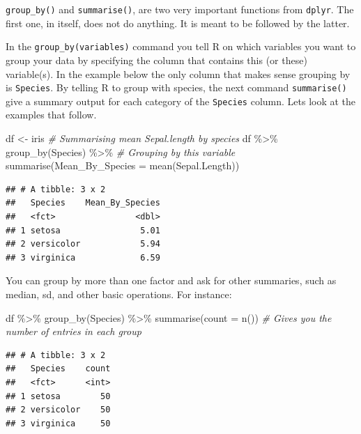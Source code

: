 \documentclass[
]{book}
\newenvironment{Shaded}{\begin{snugshade}}{\end{snugshade}}
\newcommand{\AttributeTok}[1]{\textcolor[rgb]{0.77,0.63,0.00}{#1}}
\newcommand{\CommentTok}[1]{\textcolor[rgb]{0.56,0.35,0.01}{\textit{#1}}}
\newcommand{\FunctionTok}[1]{\textcolor[rgb]{0.00,0.00,0.00}{#1}}
\newcommand{\NormalTok}[1]{#1}
\newcommand{\OtherTok}[1]{\textcolor[rgb]{0.56,0.35,0.01}{#1}}
\newcommand{\SpecialCharTok}[1]{\textcolor[rgb]{0.00,0.00,0.00}{#1}}
\begin{document}
\texttt{group\_by()} and \texttt{summarise()}, are two very important functions from \texttt{dplyr}.
The first one, in itself, does not do anything.
It is meant to be followed by the latter.

In the \texttt{group\_by(variables)} command you tell R on which variables you want to group your data by specifying the column that contains this (or these) variable(s).
In the example below the only column that makes sense grouping by is \texttt{Species}.
By telling R to group with species, the next command \texttt{summarise()} give a summary output for each category of the \texttt{Species} column.
Lets look at the examples that follow.

\begin{Shaded}
\begin{Highlighting}[]
\NormalTok{df }\OtherTok{\textless{}{-}}\NormalTok{ iris}
\CommentTok{\# Summarising mean Sepal.length by species}
\NormalTok{df }\SpecialCharTok{\%\textgreater{}\%} 
  \FunctionTok{group\_by}\NormalTok{(Species) }\SpecialCharTok{\%\textgreater{}\%}  \CommentTok{\# Grouping by this variable}
  \FunctionTok{summarise}\NormalTok{(}\AttributeTok{Mean\_By\_Species =} \FunctionTok{mean}\NormalTok{(Sepal.Length)) }
\end{Highlighting}
\end{Shaded}

\begin{verbatim}
## # A tibble: 3 x 2
##   Species    Mean_By_Species
##   <fct>                <dbl>
## 1 setosa                5.01
## 2 versicolor            5.94
## 3 virginica             6.59
\end{verbatim}

You can group by more than one factor and ask for other summaries, such as median, sd, and other basic operations.
For instance:

\begin{Shaded}
\begin{Highlighting}[]
\NormalTok{df }\SpecialCharTok{\%\textgreater{}\%} 
  \FunctionTok{group\_by}\NormalTok{(Species) }\SpecialCharTok{\%\textgreater{}\%} 
  \FunctionTok{summarise}\NormalTok{(}\AttributeTok{count =} \FunctionTok{n}\NormalTok{())  }\CommentTok{\# Gives you the number of entries in each group}
\end{Highlighting}
\end{Shaded}

\begin{verbatim}
## # A tibble: 3 x 2
##   Species    count
##   <fct>      <int>
## 1 setosa        50
## 2 versicolor    50
## 3 virginica     50
\end{verbatim}
\end{document}
